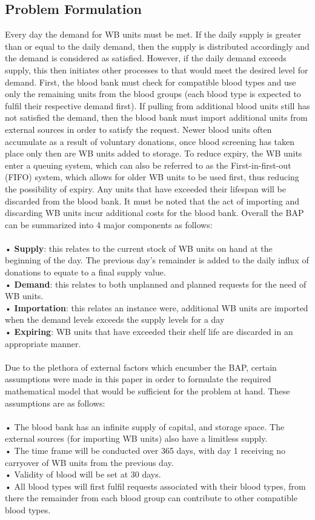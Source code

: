 \documentclass{article}
\begin{document}
\subsection{Problem Formulation}
Every day the demand for WB units must be met. If the daily supply is greater than or equal to the daily demand, then the supply is distributed accordingly and the demand is considered as satisfied. However, if the daily demand exceeds supply, this then initiates other processes to that would meet the desired level for demand. First, the blood bank must check for compatible blood types and use only the remaining units from the blood groups (each blood type is expected to fulfil their respective demand first). If pulling from additional blood units still has not satisfied the demand, then the blood bank must import additional units from external sources in order to satisfy the request. Newer blood units often accumulate as a result of voluntary donations, once blood screening has taken place only then are WB units added to storage. To reduce expiry, the WB units enter a queuing system, which can also be referred to as the First-in-first-out (FIFO) system, which allows for older WB units to be used first, thus reducing the possibility of expiry. Any units that have exceeded their lifespan will be discarded from the blood bank. It must be noted that the act of importing and discarding WB units incur additional costs for the blood bank. Overall the BAP can be summarized into 4 major components as follows:
\\
\\
•	\textbf{Supply}: this relates to the current stock of WB units on hand at the beginning of the day. The previous day’s remainder is added to the daily influx of donations to equate to a final supply value.\\
•	\textbf{Demand}: this relates to both unplanned and planned requests for the need of WB units.\\
•	\textbf{Importation}: this relates an instance were, additional WB units are imported when the demand levels exceeds the supply levels for a day\\
•	\textbf{Expiring}: WB units that have exceeded their shelf life are discarded in an appropriate manner.\\
\\
Due to the plethora of external factors which encumber the BAP, certain assumptions were made in this paper in order to formulate the required mathematical model that would be sufficient for the problem at hand. These assumptions are as follows:\\
\\
•	The blood bank has an infinite supply of capital, and storage space. The external sources (for importing WB units) also have a limitless supply.\\
•	The time frame will be conducted over 365 days, with day 1 receiving no carryover of WB units from the previous day.\\
•	Validity of blood will be set at 30 days.\\
•	All blood types will first fulfil requests associated with their blood types, from there the remainder from each blood group can contribute to other compatible blood types.\\
\\
\end{document}
